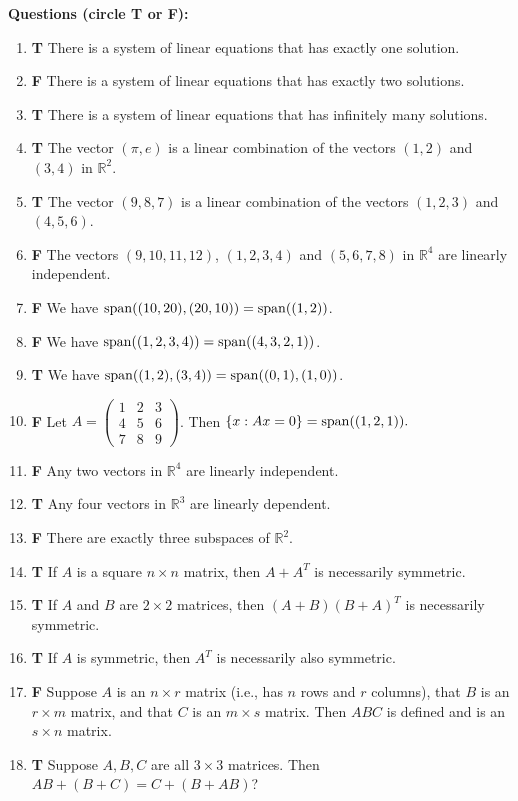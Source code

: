 \documentclass[11pt]{article}
\newcommand{\tf}[2]{\item {\bf {\color{blue}#1}}\hspace{1em} #2}
\begin{document}
{\noindent\bf \color{red} Questions (circle T or F):}
\begin{enumerate}

\tf{T}{There is a system of linear equations that has exactly one solution.}

\tf{F}{There is a system of linear equations that has exactly two solutions.}

\tf{T}{There is a system of linear equations that has infinitely many solutions.}

\tf{T}{The vector $(\pi,e)$ is a linear combination of the vectors $(1,2)$ and $(3,4)$ in $\mathbb{R}^2$.}

\tf{T}{The vector $(9,8,7)$ is a linear combination of the vectors $(1,2,3)$ and $(4,5,6)$.}

\tf{F}{The vectors $(9,10,11,12)$, $(1,2,3,4)$ and $(5,6,7,8)$ in $\mathbb{R}^4$ are linearly independent.}

\tf{F}{We have ${\rm span}((10,20),(20,10)) = {\rm span}((1,2))$.}

\tf{F}{We have ${\rm span}((1,2,3,4)) = {\rm span}((4,3,2,1))$.}

\tf{T}{We have ${\rm span}((1,2),(3,4)) = {\rm span}((0,1),(1,0))$.}

\tf{F}{Let $A=\left(\begin{array}{rrr}1 & 2 & 3 \\4 & 5 & 6 \\7 & 8 & 9\end{array}\right)$.  Then $\{ x : Ax=0 \} = {\rm span}((1,2,1)).$}

\tf{F}{Any two vectors in $\mathbb{R}^{4}$ are linearly independent.}

\tf{T}{Any four vectors in $\mathbb{R}^3$ are linearly dependent.}

\tf{F}{There are exactly three subspaces of $\mathbb{R}^2$.}

\tf{T}{If $A$ is a square $n\times n$ matrix, then $A + A^T$ is necessarily symmetric.}

\tf{T}{If $A$ and $B$ are $2\times 2$ matrices, then $(A+B)(B+A)^T$ is necessarily symmetric.}

\tf{T}{If $A$ is symmetric, then $A^T$ is necessarily also symmetric.}

\tf{F}{Suppose $A$ is an $n\times r$ matrix (i.e., has $n$ rows and $r$ columns), that $B$ is an $r\times m$ matrix, and that $C$ is an $m\times s$ matrix.  Then $ABC$ is defined and is an $s\times n$ matrix.}

\tf{T}{Suppose $A,B,C$ are all $3\times 3$ matrices. Then  $AB + (B + C) = C + (B + AB)$?}


\end{enumerate}
\end{document}

